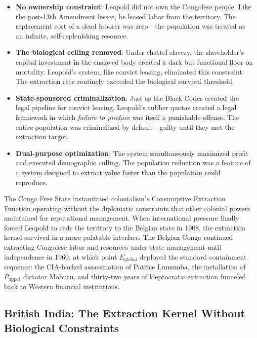 \begin{itemize}
    \item \textbf{No ownership constraint}: Leopold did not own the Congolese people. Like the post-13th Amendment lessee, he leased labor from the territory. The replacement cost of a dead laborer was zero---the population was treated as an infinite, self-replenishing resource.

    \item \textbf{The biological ceiling removed}: Under chattel slavery, the slaveholder's capital investment in the enslaved body created a dark but functional floor on mortality. Leopold's system, like convict leasing, eliminated this constraint. The extraction rate routinely exceeded the biological survival threshold.

    \item \textbf{State-sponsored criminalization}: Just as the Black Codes created the legal pipeline for convict leasing, Leopold's rubber quotas created a legal framework in which \textit{failure to produce} was itself a punishable offense. The entire population was criminalized by default---guilty until they met the extraction target.

    \item \textbf{Dual-purpose optimization}: The system simultaneously maximized profit and executed demographic culling. The population reduction was a feature of a system designed to extract value faster than the population could reproduce.
\end{itemize}

The Congo Free State instantiated colonialism's Consumptive Extraction Function operating without the diplomatic constraints that other colonial powers maintained for reputational management. When international pressure finally forced Leopold to cede the territory to the Belgian state in 1908, the extraction kernel survived in a more palatable interface. The Belgian Congo continued extracting Congolese labor and resources under state management until independence in 1960, at which point $E_{\text{global}}$ deployed the standard containment sequence: the CIA-backed assassination of Patrice Lumumba, the installation of $P_{\text{uppet}}$ dictator Mobutu, and thirty-two years of kleptocratic extraction funneled back to Western financial institutions.

\subsection{British India: The Extraction Kernel Without Biological Constraints}

